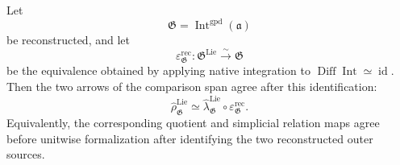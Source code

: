 \begin{proposition}
\label{prop:bnli-reconstructed-span-compatibility}
Let
\[
    \mathfrak G
    =
    \operatorname{Int}^{\mathrm{gpd}}(\mathfrak a)
\]
be reconstructed, and let
\[
    \varepsilon_{\mathfrak G}^{\mathrm{rec}}:
    \mathfrak G^{\mathrm{Lie}}
    \xrightarrow{\sim}
    \mathfrak G
\]
be the equivalence obtained by applying native integration to
$\operatorname{Diff}\operatorname{Int}\simeq\operatorname{id}$.  Then the two
arrows of the comparison span agree after this identification:
\[
\boxed{
    \widehat\rho^{\mathrm{Lie}}_{\mathfrak G}
    \simeq
    \widehat\lambda^{\mathrm{Lie}}_{\mathfrak G}
    \circ
    \varepsilon_{\mathfrak G}^{\mathrm{rec}}.}
\]
Equivalently, the corresponding quotient and simplicial relation maps agree
before unitwise formalization after identifying the two reconstructed outer
sources.
\end{proposition}

